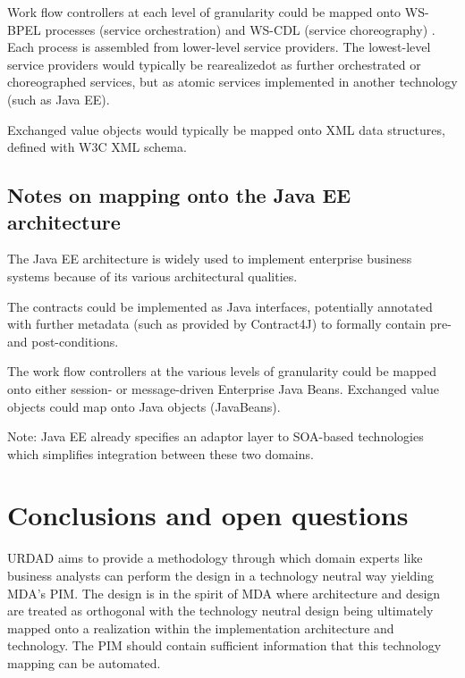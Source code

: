 \documentclass{IOS-Book-Article}
\begin{document}
Work flow controllers at each level of granularity could be mapped onto
WS-BPEL processes (service orchestration) \cite{oasis:bpel} and WS-CDL (service choreography) \cite{w3c:cdl}.
Each process is assembled from lower-level service providers.
The lowest-level service providers would typically be
rearealizedot as further orchestrated or choreographed services, but as
atomic services implemented in another technology (such as Java EE).

Exchanged value objects would typically be mapped onto XML data structures,
defined with W3C XML schema. 


\subsection{Notes on mapping onto the Java EE architecture}

The Java EE architecture \cite{sun:javaee} is widely used to implement 
enterprise business systems because of its various architectural qualities.

The contracts could be implemented as Java interfaces, potentially annotated
with further metadata (such as provided by Contract4J) to formally
contain pre- and post-conditions.

The work flow controllers at the various levels of granularity could be
mapped onto either session- or message-driven Enterprise Java Beans. 
Exchanged value objects could map onto Java objects (JavaBeans).

Note: Java EE already specifies an adaptor layer to SOA-based technologies
which simplifies integration between these two domains. \cite{sun:soaWithJavaee}


\section{Conclusions and open questions}

URDAD aims to provide a methodology through which domain experts like business
analysts can perform the design in a technology neutral way yielding MDA's PIM.
The design is in the spirit of MDA where architecture and design are treated as
orthogonal with the technology neutral design being ultimately mapped onto a
realization within the implementation architecture and technology. The PIM
should contain sufficient information that this technology mapping can be
automated.
\end{document}
